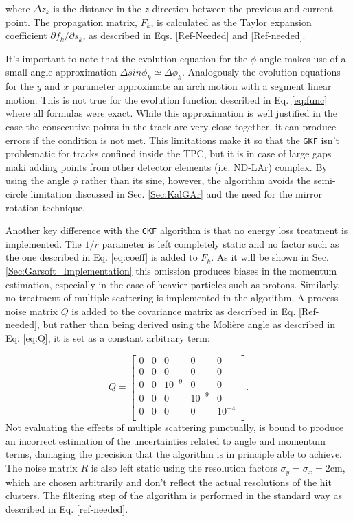 where $\Delta z_k$ is the distance in the $z$ direction between the previous and current point. The propagation matrix, $F_k$, is calculated as the Taylor expansion coefficient $\partial f_k/ \partial s_k$, as described in Eqs. [Ref-Needed] and [Ref-needed].

It's important to note that the evolution equation for the $\phi$ angle makes use of a small angle approximation $\Delta sin\phi_k\simeq \Delta \phi_k$. Analogously the evolution equations for the $y$ and $x$ parameter approximate an arch motion with a segment linear motion. This is not true for the evolution function described in Eq. \ref{eq:func} where all formulas were exact. While this approximation is well justified in the case the consecutive points in the track are very close together, it can produce errors if the condition is not met. This limitations make it so that the \texttt{GKF} isn't problematic for tracks confined inside the TPC, but it is in case of large gaps maki adding points from other detector elements (i.e. ND-LAr) complex. By using the angle $\phi$ rather than its sine, however, the algorithm avoids the semi-circle limitation discussed in Sec. \ref{Sec:KalGAr} and the need for the mirror rotation technique. 

Another key difference with the \texttt{CKF} algorithm is that no energy loss treatment is implemented. The $1/r$ parameter is left completely static and no factor such as the one described in Eq. \ref{eq:coeff} is added to $F_k$. As it will be shown in Sec. \ref{Sec:Garsoft_Implementation} this omission produces biases in the momentum estimation, especially in the case of heavier particles such as protons. Similarly, no treatment of multiple scattering is implemented in the algorithm. A process noise matrix $Q$ is added to the covariance matrix as described in Eq. [Ref-needed], but rather than being derived using the Molière angle as described in Eq. \ref{eq:Q}, it is set as a constant arbitrary term:

\begin{equation}\label{eq:Q2}
    Q =\begin{bmatrix}
    0 & 0 & 0 & 0& 0 \\
    0 & 0 & 0 & 0& 0 \\
    0 & 0 & 10^{-9} & 0& 0 \\
    0 & 0 & 0 & 10^{-9}& 0 \\
    0 & 0 & 0 & 0& 10^{-4} \\
    \end{bmatrix} .
\end{equation}
Not evaluating the effects of multiple scattering punctually, is bound to produce an incorrect estimation of the uncertainties related to angle and momentum terms, damaging the precision that the algorithm is in principle able to achieve. The noise matrix $R$ is also left static using the resolution factors $\sigma_y=\sigma_x=2 \text{cm}$, which are chosen arbitrarily and don't reflect the actual resolutions of the hit clusters. The filtering step of the algorithm is performed in the standard way as described in Eq. [ref-needed].

